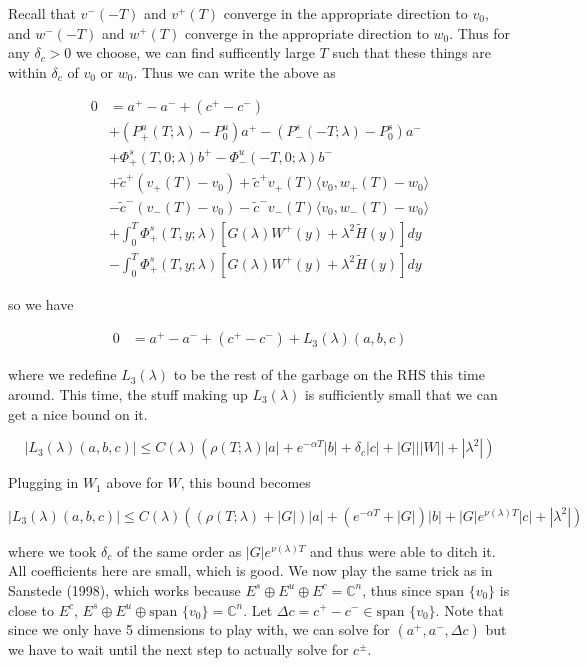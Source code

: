 \documentclass[12pt]{article}
\def\C{{\mathbb C}}
\begin{document}
\begin{enumerate}
Recall that $v^-(-T)$ and $v^+(T)$ converge in the appropriate direction to $v_0$, and $w^-(-T)$ and $w^+(T)$ converge in the appropriate direction to $w_0$. Thus for any $\delta_c > 0$ we choose, we can find sufficently large $T$ such that these things are within $\delta_c$ of $v_0$ or $w_0$. Thus we can write the above as

\begin{align*}
0 &= a^+ - a^- + (c^+ - c^-) \\
&+ (P^u_+(T; \lambda) - P_0^u)a^+ - (P^s_-(-T; \lambda) - P_0^s)a^- \\
&+ \Phi^s_+(T, 0; \lambda)b^+ - \Phi^u_-(-T, 0; \lambda)b^- \\
&+ \tilde{c}^+( v_+(T) - v_0) + \tilde{c}^+ v_+(T) \langle v_0, w_+(T) - w_0 \rangle \\
&- \tilde{c}^-( v_-(T) - v_0) - \tilde{c}^- v_-(T) \langle v_0, w_-(T) - w_0 \rangle \\
&+ \int_0^T \Phi^s_+(T, y; \lambda) [ G(\lambda)W^+(y) + \lambda^2 \tilde{H}(y) ] dy \\
&- \int_0^T \Phi^s_+(T, y; \lambda) [ G(\lambda)W^+(y) + \lambda^2 \tilde{H}(y) ] dy
\end{align*}

so we have

\begin{align*}
0 &= a^+ - a^- + (c^+ - c^-) + L_3(\lambda)(a, b, c)
\end{align*}

where we redefine $L_3(\lambda)$ to be the rest of the garbage on the RHS this time around. This time, the stuff making up $L_3(\lambda)$ is sufficiently small that we can get a nice bound on it. 

\[
|L_3(\lambda)(a, b, c)| \leq C(\lambda) ( \rho(T; \lambda)|a|
+ e^{-\alpha T}|b| + \delta_c|c| + |G|||W|| + |\lambda^2| )
\]

Plugging in $W_1$ above for $W$, this bound becomes

\[
|L_3(\lambda)(a, b, c)| \leq C(\lambda) ( (\rho(T; \lambda) + |G| ) |a|
+ (e^{-\alpha T} + |G|) |b| + |G|e^{\nu(\lambda)T}|c| + |\lambda^2| )
\]

where we took $\delta_c$ of the same order as $|G|e^{\nu(\lambda)T}$ and thus were able to ditch it. All coefficients here are small, which is good. We now play the same trick as in Sanstede (1998), which works because $E^s \oplus E^u \oplus E^c = \C^n$, thus since $\text{span }\{v_0\}$ is close to $E^c$, $E^s \oplus E^u \oplus \text{span }\{v_0\} = \C^n$. Let $\Delta c = c^+ - c^- \in \text{span }\{v_0\}$. Note that since we only have 5 dimensions to play with, we can solve for $(a^+, a^-, \Delta c)$ but we have to wait until the next step to actually solve for $c^\pm$.\\


\end{enumerate}
\end{document}
